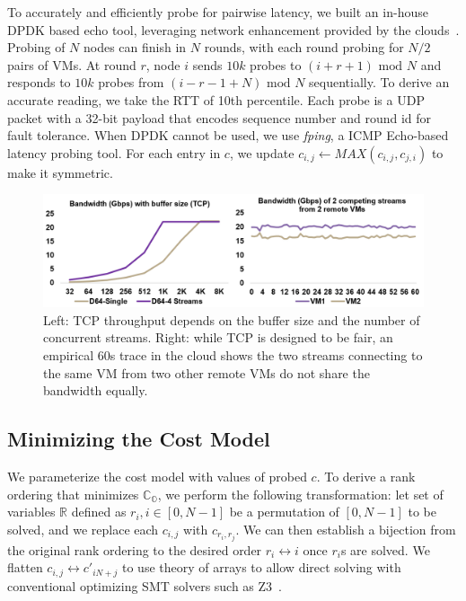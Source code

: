 To accurately and efficiently probe for pairwise latency, we built an in-house DPDK based echo tool, leveraging network enhancement provided by the clouds~\cite{Createan37:online, Enablean80:online}. Probing of $N$ nodes can finish in $N$ rounds, with each round probing for $N/2$ pairs of VMs. At round $r$, node $i$ sends $10k$ probes to $(i + r + 1) \text{ mod } N$ and responds to $10k$ probes from $(i - r - 1 + N) \text{ mod } N$ sequentially. To derive an accurate reading, we take the RTT of 10th percentile. Each probe is a UDP packet with a 32-bit payload that encodes sequence number and round id for fault tolerance. When DPDK cannot be used, we use \textit{fping}, a ICMP Echo-based latency probing tool. For each entry in $c$, we update $c_{i,j} \leftarrow MAX(c_{i,j}, c_{j,i})$ to make it symmetric.


\begin{figure}[t!]
    \centering
    \includegraphics[width=\linewidth]{Figures/tcpchartacteristics.png}
    \caption{Left: TCP throughput depends on the buffer size and the number of concurrent streams. Right: while TCP is designed to be fair, an empirical 60s trace in the cloud shows the two streams connecting to the same VM from two other remote VMs do not share the bandwidth equally.}
    \label{fig:tcpchartacteristics}
\end{figure}



\subsection{Minimizing the Cost Model}
We parameterize the cost model with values of probed $c$. To derive a rank ordering that minimizes $\mathbb{C_O}$, we perform the following transformation: let set of variables $\mathbb{R}$ defined as $r_i, i \in [0,N-1]$ be a permutation of $[0,N-1]$ to be solved, and we replace each $c_{i,j}$ with $c_{r_i,r_j}$. We can then establish a bijection from the original rank ordering to the desired order $r_i \leftrightarrow i$ once $r_i$s are solved. We flatten $c_{i,j} \leftrightarrow c'_{iN + j}$ to use theory of arrays to allow direct solving with conventional optimizing SMT solvers such as Z3~\cite{de2008z3,ORToolsG24:online}. 

